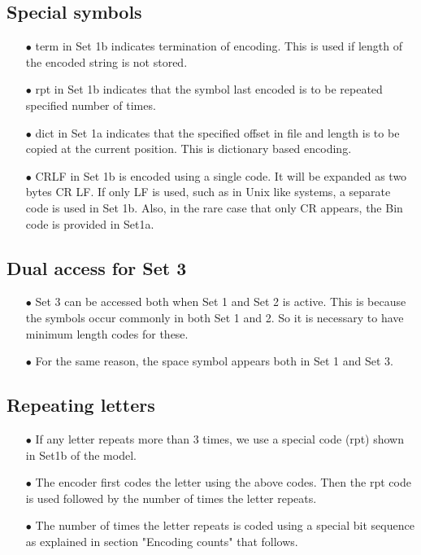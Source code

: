 \documentclass[]{article}
\begin{document}
\subsection{Special symbols}
\begin{itemize}
	\item[$\bullet$] term in Set 1b indicates termination of encoding.  This is used if length of the encoded string is not stored.
	\item[$\bullet$] rpt in Set 1b indicates that the symbol last encoded is to be repeated specified number of times.
	\item[$\bullet$] dict in Set 1a indicates that the specified offset in file and length is to be copied at the current position. This is dictionary based encoding.
	\item[$\bullet$] CRLF in Set 1b is encoded using a single code. It will be expanded as two bytes CR LF.  If only LF is used, such as in Unix like systems, a separate code is used in Set 1b.  Also, in the rare case that only CR appears, the Bin code is provided in Set1a.
\end{itemize}

\subsection{Dual access for Set 3}
\begin{itemize}
	\item[$\bullet$] Set 3 can be accessed both when Set 1 and Set 2 is active.  This is because the symbols occur commonly in both Set 1 and 2.  So it is necessary to have minimum length codes for these.
	\item[$\bullet$] For the same reason, the space symbol appears both in Set 1 and Set 3.
\end{itemize}

\subsection{Repeating letters}
\begin{itemize}
	\item[$\bullet$] If any letter repeats more than 3 times, we use a special code (rpt) shown in Set1b of the model.
	\item[$\bullet$] The encoder first codes the letter using the above codes.  Then the rpt code is used followed by the number of times the letter repeats.
	\item[$\bullet$] The number of times the letter repeats is coded using a special bit sequence as explained in section "Encoding counts" that follows.
\end{itemize}
\end{document}
